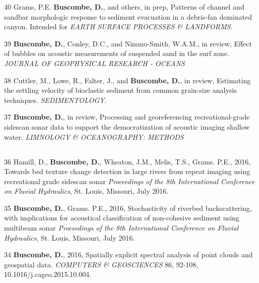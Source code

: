 \documentclass[margin,line]{resume}
\begin{document}
\begin{resume}
\begin{footnotesize}
\begin{list1}
	\item[40] Grams, P.E. {\bf Buscombe, D.}, and others, in prep, Patterns of channel and sandbar morphologic response to sediment evacuation in a debris-fan dominated canyon. Intended for {\sl EARTH SURFACE PROCESSES \& LANDFORMS}.\\
	
	\item[39] {\bf 	Buscombe, D.}, Conley, D.C., and Nimmo-Smith, W.A.M., in review, Effect of bubbles on acoustic measurements of suspended sand in the surf zone. {\sl JOURNAL OF GEOPHYSICAL RESEARCH - OCEANS}\\

	\item[38] Cuttler, M., Lowe, R., Falter, J., and {\bf Buscombe, D.}, in review, Estimating the settling velocity of bioclastic sediment from common grain-size analysis techniques. {\sl SEDIMENTOLOGY}.\\
		
	\item[37] {\bf Buscombe, D.}, in review, Processing and georeferencing recreational-grade sidescan sonar data to support the democratization of acoustic imaging shallow water. {\sl LIMNOLOGY \& OCEANOGRAPHY: METHODS}
	
	\end{list1}
	
	\subsection{}
	\begin{list1}
        \item[36] Hamill, D., {\bf Buscombe, D.}, Wheaton, J.M., Melis, T.S., Grams. P.E., 2016, Towards bed texture change detection in large rivers from repeat imaging using recreational grade sidescan sonar {\sl Proceedings of the 8th International Conference on Fluvial Hydraulics}, St. Louis, Missouri, July 2016.\\
        
        \item[35] {\bf Buscombe, D.}, Grams. P.E., 2016, Stochasticity of riverbed backscattering, with implications for acoustical classification of non-cohesive sediment using multibeam sonar {\sl Proceedings of the 8th International Conference on Fluvial Hydraulics}, St. Louis, Missouri, July 2016.\\

	\item[34] {\bf 	Buscombe, D.}, 2016, Spatially explicit spectral analysis of point clouds and geospatial data. {\sl COMPUTERS \& GEOSCIENCES} 86, 92-108, 10.1016/j.cageo.2015.10.004.


\end{list1}
\end{footnotesize}
\end{resume}
\end{document}
